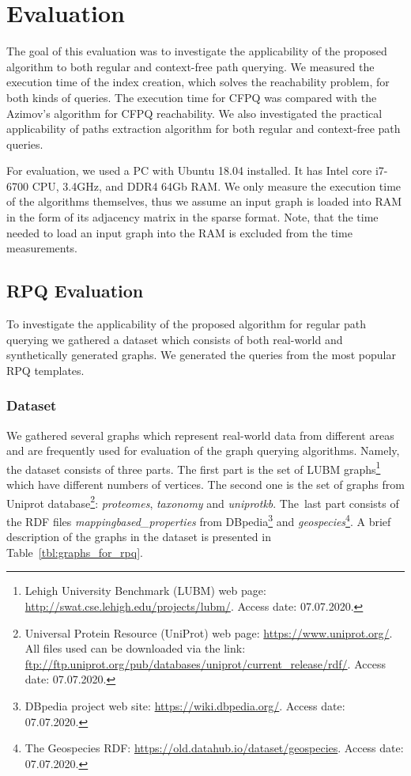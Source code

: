 \section{Evaluation}

The goal of this evaluation was to investigate the applicability of the proposed algorithm to both regular and context-free path querying.
We measured the execution time of the index creation, which solves the reachability problem, for both kinds of queries.
The execution time for CFPQ was compared with the Azimov's algorithm for CFPQ reachability.
We also investigated the practical applicability of paths extraction algorithm for both regular and context-free path queries.

For evaluation, we used a PC with Ubuntu 18.04 installed.
It has Intel core i7-6700 CPU, 3.4GHz, and DDR4 64Gb RAM.
We only measure the execution time of the algorithms themselves, thus we assume an input graph is loaded into RAM in the form of its adjacency matrix in the sparse format.
Note, that the time needed to load an input graph into the RAM is excluded from the time measurements.

\subsection{RPQ Evaluation}

To investigate the applicability of the proposed algorithm for regular path querying we gathered a dataset which consists of both real-world and synthetically generated graphs.
We generated the queries from the most popular RPQ templates.

\subsubsection{Dataset}

We gathered several graphs which represent real-world data from different areas and are frequently used for evaluation of the graph querying algorithms.
Namely, the dataset consists of three parts.
The first part is the set of LUBM graphs\footnote{Lehigh University Benchmark (LUBM) web page: \url{http://swat.cse.lehigh.edu/projects/lubm/}. Access date: 07.07.2020.}~\citep{10.1016/j.websem.2005.06.005} which have different numbers of vertices.
The second one is the set of graphs from Uniprot database\footnote{Universal Protein Resource (UniProt) web page: \url{https://www.uniprot.org/}. All files used can be downloaded via the link: \url{ftp://ftp.uniprot.org/pub/databases/uniprot/current_release/rdf/}. Access date: 07.07.2020.}: \textit{proteomes}, \textit{taxonomy} and \textit{uniprotkb}.
The~last part consists of the RDF files \textit{mappingbased\_properties} from DBpedia\footnote{DBpedia project web site: \url{https://wiki.dbpedia.org/}. Access date: 07.07.2020.} and \textit{geospecies}\footnote{The Geospecies RDF: \url{https://old.datahub.io/dataset/geospecies}. Access date: 07.07.2020.}.
A brief description of the graphs in the dataset is presented in Table~\ref{tbl:graphs_for_rpq}.

